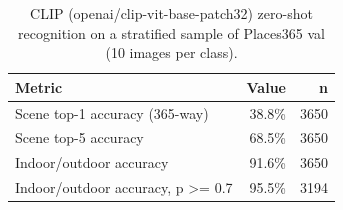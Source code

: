 \begin{table}[t]
\centering
\caption{CLIP (openai/clip-vit-base-patch32) zero-shot recognition on a stratified sample of Places365 val (10 images per class).}
\label{tab:table1_scene_recognition}
\begin{tabular}{lrr}
\toprule
Metric & Value & n \\
\midrule
Scene top-1 accuracy (365-way) & 38.8\% & 3650 \\
Scene top-5 accuracy & 68.5\% & 3650 \\
Indoor/outdoor accuracy & 91.6\% & 3650 \\
Indoor/outdoor accuracy, p >= 0.7 & 95.5\% & 3194 \\
\bottomrule
\end{tabular}
\end{table}
